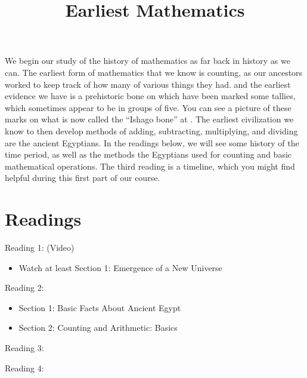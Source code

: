 \documentclass{ximera}
\title{Earliest Mathematics}
\begin{document}
\begin{abstract}
\end{abstract}
\maketitle

We begin our study of the history of mathematics as far back in history as we can.  The earliest form of mathematics that we know is counting, as our 
ancestors worked to keep track of how many of various things they had. and the earliest evidence we have is a prehistoric bone on which have been 
marked some tallies, which sometimes appear to be in groups of five.  You can see a picture of these marks on what is now called the ``Ishago bone'' 
at .  The earliest civilization we know to then develop methods of 
adding, subtracting, multiplying, and dividing are the ancient Egyptians.  In the readings below, we will see some history of the time period, as well as 
the methods the Egyptians used for counting and basic mathematical operations.  The third reading is a timeline, which you might find helpful during 
this first part of our course.




\section{Readings}

Reading 1: (Video) 
\begin{itemize}
\item Watch at least Section 1: Emergence of a New Universe
\end{itemize}

Reading 2: 
\begin{itemize}
\item Section 1: Basic Facts About Ancient Egypt
\item Section 2: Counting and Arithmetic: Basics
\end{itemize}

Reading 3: 

Reading 4: 
\end{document}
